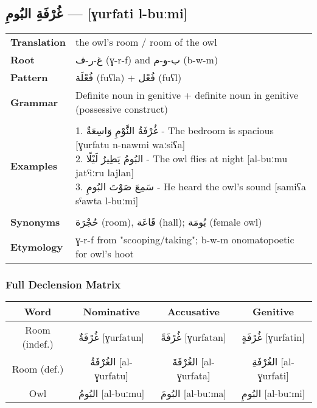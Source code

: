 \documentclass[letterpaper,12pt]{article}
\begin{document}
\subsection{\textarabic{غُرْفَةِ البُومِ} — [ɣurfati l-buːmi]}
\begin{tabular}{p{3cm}p{10cm}}
\toprule
\textbf{Translation} & the owl's room / room of the owl \\
\textbf{Root} & \textarabic{غ-ر-ف} (ɣ-r-f) and \textarabic{ب-و-م} (b-w-m) \\
\textbf{Pattern} & \textarabic{فُعْلَة} (fuʕla) + \textarabic{فُعْل} (fuʕl) \\
\textbf{Grammar} & Definite noun in genitive + definite noun in genitive (possessive construct) \\
\midrule \\
\textbf{Examples} & \makecell[l]{\parbox{9.5cm}{
1. \textarabic{غُرْفَةُ النَّوْمِ وَاسِعَةٌ} - The bedroom is spacious [ɣurfatu n-nawmi waːsiʕa]\\
2. \textarabic{البُومُ يَطِيرُ لَيْلًا} - The owl flies at night [al-buːmu jatˤiːru lajlan]\\
3. \textarabic{سَمِعَ صَوْتَ البُومِ} - He heard the owl's sound [samiʕa sˤawta l-buːmi]
}} \\
\midrule \\
\textbf{Synonyms} & \textarabic{حُجْرَة} (room), \textarabic{قَاعَة} (hall); \textarabic{بُومَة} (female owl) \\
\textbf{Etymology} & ɣ-r-f from "scooping/taking"; b-w-m onomatopoetic for owl's hoot \\
\bottomrule
\end{tabular}

\subsubsection*{Full Declension Matrix}
\begin{tabular}{|c|c|c|c|}
\hline
\textbf{Word} & \textbf{Nominative} & \textbf{Accusative} & \textbf{Genitive} \\
\hline
Room (indef.) & \textarabic{غُرْفَةٌ} [ɣurfatun] & \textarabic{غُرْفَةً} [ɣurfatan] & \textarabic{غُرْفَةٍ} [ɣurfatin] \\
\hline
Room (def.) & \textarabic{الغُرْفَةُ} [al-ɣurfatu] & \textarabic{الغُرْفَةَ} [al-ɣurfata] & \textarabic{الغُرْفَةِ} [al-ɣurfati] \\
\hline
Owl & \textarabic{البُومُ} [al-buːmu] & \textarabic{البُومَ} [al-buːma] & \textarabic{البُومِ} [al-buːmi] \\
\hline
\end{tabular}
\end{document}
